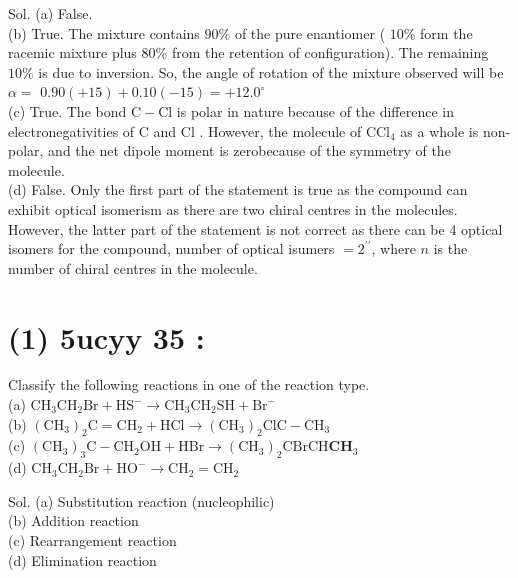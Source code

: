 \documentclass[10pt]{article}
\begin{document}
Sol. (a) False.\\
(b) True. The mixture contains $90 \%$ of the pure enantiomer ( $10 \%$ form the racemic mixture plus $80 \%$ from the retention of configuration). The remaining $10 \%$ is due to inversion. So, the angle of rotation of the mixture observed will be $\alpha=$ $0.90(+15)+0.10(-15)=+12.0^{\circ}$\\
(c) True. The bond $\mathrm{C}-\mathrm{Cl}$ is polar in nature because of the difference in electronegativities of C and Cl . However, the molecule of $\mathrm{CCl}_{4}$ as a whole is non-polar, and the net dipole moment is zerobecause of the symmetry of the molecule.\\
(d) False. Only the first part of the statement is true as the compound can exhibit optical isomerism as there are two chiral centres in the molecules. However, the latter part of the statement is not correct as there can be 4 optical isomers for the compound, number of optical isumers $=2^{\prime \prime}$, where $n$ is the number of chiral centres in the molecule.

\section*{(1) 5ucyy 35 :}
Classify the following reactions in one of the reaction type.\\
(a) $\mathrm{CH}_{3} \mathrm{CH}_{2} \mathrm{Br}+\mathrm{HS}^{-} \longrightarrow \mathrm{CH}_{3} \mathrm{CH}_{2} \mathrm{SH}+\mathrm{Br}^{-}$\\
(b) $\left(\mathrm{CH}_{3}\right)_{2} \mathrm{C}=\mathrm{CH}_{2}+\mathrm{HCl} \longrightarrow\left(\mathrm{CH}_{3}\right)_{2} \mathrm{ClC}-\mathrm{CH}_{3}$\\
(c) $\left(\mathrm{CH}_{3}\right)_{3} \mathrm{C}-\mathrm{CH}_{2} \mathrm{OH}+\mathrm{HBr} \longrightarrow\left(\mathrm{CH}_{3}\right)_{2} \mathrm{CBrCH} \mathbf{C H}_{3}$\\
(d) $\mathrm{CH}_{3} \mathrm{CH}_{2} \mathrm{Br}+\mathrm{HO}^{-} \longrightarrow \mathrm{CH}_{2}=\mathrm{CH}_{2}$

Sol. (a) Substitution reaction (nucleophilic)\\
(b) Addition reaction\\
(c) Rearrangement reaction\\
(d) Elimination reaction
\end{document}

